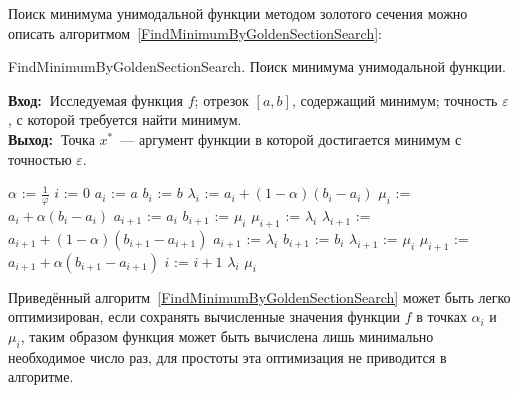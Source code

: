 \documentclass[10pt,a4paper,titlepage]{article}
\newcommand{\INPUT}{\textbf{Вход:~}}
\newcommand{\OUTPUT}{\textbf{Выход:~}}
\begin{document}
Поиск минимума унимодальной функции методом золотого сечения можно описать алгоритмом~\ref{FindMinimumByGoldenSectionSearch}:
\begin{algorithm}[H]
\caption{FindMinimumByGoldenSectionSearch. Поиск минимума унимодальной функции.}
\label{FindMinimumByGoldenSectionSearch}
\INPUT Исследуемая функция $f$; отрезок $[a,b]$, содержащий минимум; точность $\varepsilon$, с которой требуется найти минимум. \\
\OUTPUT Точка $x^*$~--- аргумент функции в которой достигается минимум с точностью $\varepsilon$.

\begin{algorithmic}
\STATE {}
\STATE $\alpha$ := $\frac{1}{\varphi}$ 
\STATE $i$ := 0 
\STATE {}
\STATE $a_i$ := $a$
\STATE $b_i$ := $b$
\STATE {}
\STATE $\lambda_i$ := $a_i + (1 - \alpha)(b_i - a_i)$
\STATE $\mu_i$ := $a_i + \alpha(b_i - a_i)$
\STATE {}
    \STATE {}
    \STATE $a_{i+1}$ := $a_i$
    \STATE $b_{i+1}$ := $\mu_i$
    \STATE {}
    \STATE $\mu_{i+1}$ := $\lambda_i$
    \STATE $\lambda_{i+1}$ := $a_{i+1} + (1 - \alpha)(b_{i+1} - a_{i+1})$
  \ELSE
    \STATE {}
    \STATE $a_{i+1}$ := $\lambda_i$
    \STATE $b_{i+1}$ := $b_i$
    \STATE $\lambda_{i+1}$ := $\mu_i$
    \STATE $\mu_{i+1}$ := $a_{i+1} + \alpha(b_{i+1} - a_{i+1})$
  \ENDIF
  \STATE $i$ := $i + 1$
\ENDWHILE
\STATE {}
  \RETURN $\lambda_i$
\ELSE
  \RETURN $\mu_i$
\ENDIF
\end{algorithmic}
\end{algorithm}

Приведённый алгоритм~\ref{FindMinimumByGoldenSectionSearch} может быть легко оптимизирован, 
если сохранять вычисленные значения функции $f$ в точках $\alpha_i$ и $\mu_i$, 
таким образом функция может быть вычислена лишь минимально необходимое число раз,
для простоты эта оптимизация не приводится в алгоритме.
\end{document}
